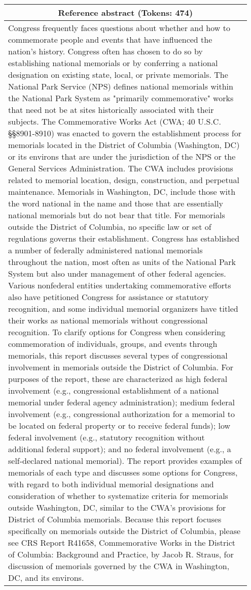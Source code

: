 \documentclass[11pt,table]{article}
\begin{document}
\begin{table*}[ht]
  \centering
  \begin{tabular}{p{0.95\linewidth}}
    \toprule
    \multicolumn{1}{c}{\textbf{Reference abstract} (Tokens: 474)} \\
    \midrule
    Congress frequently faces questions about whether and how to commemorate people and events that have influenced the nation's history. Congress often has chosen to do so by establishing national memorials or by conferring a national designation on existing state, local, or private memorials. The National Park Service (NPS) defines national memorials within the National Park System as "primarily commemorative" works that need not be at sites historically associated with their subjects. The Commemorative Works Act (CWA; 40 U.S.C. §§8901-8910) was enacted to govern the establishment process for memorials located in the District of Columbia (Washington, DC) or its environs that are under the jurisdiction of the NPS or the General Services Administration. The CWA includes provisions related to memorial location, design, construction, and perpetual maintenance. Memorials in Washington, DC, include those with the word national in the name and those that are essentially national memorials but do not bear that title. For memorials outside the District of Columbia, no specific law or set of regulations governs their establishment. Congress has established a number of federally administered national memorials throughout the nation, most often as units of the National Park System but also under management of other federal agencies. Various nonfederal entities undertaking commemorative efforts also have petitioned Congress for assistance or statutory recognition, and some individual memorial organizers have titled their works as national memorials without congressional recognition. To clarify options for Congress when considering commemoration of individuals, groups, and events through memorials, this report discusses several types of congressional involvement in memorials outside the District of Columbia. For purposes of the report, these are characterized as high federal involvement (e.g., congressional establishment of a national memorial under federal agency administration); medium federal involvement (e.g., congressional authorization for a memorial to be located on federal property or to receive federal funds); low federal involvement (e.g., statutory recognition without additional federal support); and no federal involvement (e.g., a self-declared national memorial). The report provides examples of memorials of each type and discusses some options for Congress, with regard to both individual memorial designations and consideration of whether to systematize criteria for memorials outside Washington, DC, similar to the CWA's provisions for District of Columbia memorials. Because this report focuses specifically on memorials outside the District of Columbia, please see CRS Report R41658, Commemorative Works in the District of Columbia: Background and Practice, by Jacob R. Straus, for discussion of memorials governed by the CWA in Washington, DC, and its environs.\\

\end{tabular}
\end{table*}
\end{document}
